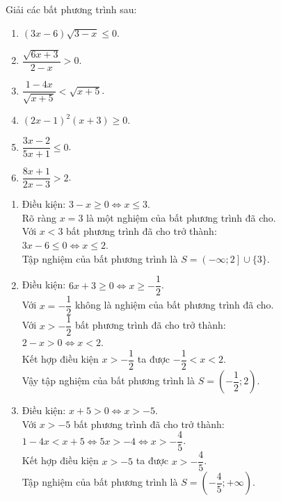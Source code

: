 \begin{bt}%
	Giải các bất phương trình sau:
	\begin{multicols}{2}
		\begin{enumerate}
			\item $(3x-6)\sqrt{3-x} \leq 0$.
			\item $\dfrac{\sqrt{6x+3}}{2-x} > 0$.
			\item $\dfrac{1-4x}{\sqrt{x+5}} < \sqrt{x+5}$.
			\item $(2x-1)^2(x+3) \geq 0$.
			\item $\dfrac{3x-2}{5x+1} \leq 0$.
			\item $\dfrac{8x+1}{2x-3} > 2$.
		\end{enumerate}
	\end{multicols}
	\loigiai
	{
		\begin{enumerate}
			\item Điều kiện: $3-x \geq 0 \Leftrightarrow x \leq 3$.\\
			Rõ ràng $x = 3$ là một nghiệm của bất phương trình đã cho.\\
			Với $x < 3$ bất phương trình đã cho trở thành:\\
			$3x-6 \leq 0 \Leftrightarrow x \leq 2$.\\
			Tập nghiệm của bất phương trình là $S=\left(-\infty; 2 \right] \cup \{3\}$.
			
			\item Điều kiện: $6x+3 \geq 0 \Leftrightarrow x \geq -\dfrac{1}{2}$.\\
			Với $x=-\dfrac{1}{2}$ không là nghiệm của bất phương trình đã cho.\\
			Với $x > -\dfrac{1}{2}$ bất phương trình đã cho trở thành:\\
			$2-x > 0 \Leftrightarrow x < 2$.\\
			Kết hợp điều kiện $x > -\dfrac{1}{2}$ ta được $-\dfrac{1}{2} <x< 2$.\\
			Vậy tập nghiệm của bất phương trình là $S=\left(-\dfrac{1}{2};2\right)$.
			
			\item Điều kiện: $x+5>0 \Leftrightarrow x>-5$.\\
			Với $x> -5$ bất phương trình đã cho trở thành:\\
			$1-4x < x+5 \Leftrightarrow 5x > -4 \Leftrightarrow x > - \dfrac{4}{5}$.\\
			Kết hợp điều kiện $x> -5$ ta được $x> - \dfrac{4}{5}$.\\
			Tập nghiệm của bất phương trình là $S=\left(-\dfrac{4}{5}; +\infty \right)$.
			

\end{enumerate}}
\end{bt}
